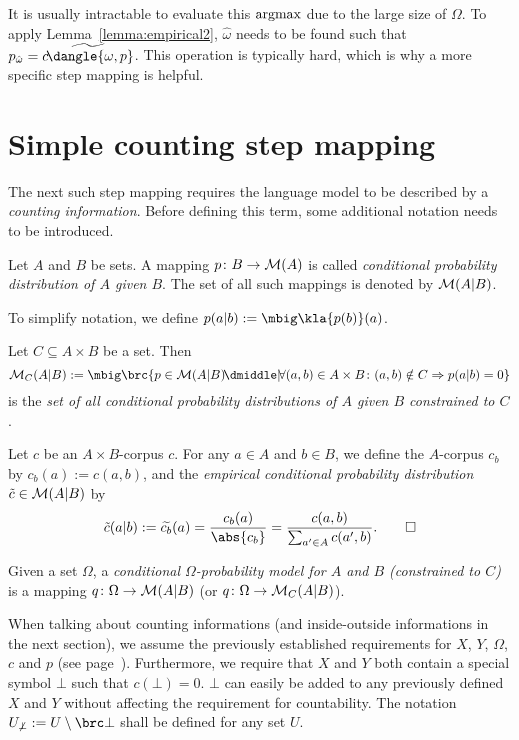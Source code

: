 It is usually intractable to evaluate this $\argmax$ due to the large size of
$\Omega$. To apply Lemma~\ref{lemma:empirical2}, $\hat\omega$ needs to be found
such that $p_{\hat\omega} = \widetilde{c\!\dangle{\omega,p}}$. This operation
is typically hard, which is why a more specific step mapping is helpful.

\section{Simple counting step mapping}

The next such step mapping requires the language model to be described by a
\emph{counting information}. Before defining this term, some additional
notation needs to be introduced.

\begin{definition}\label{def:02-cpd}
 Let $A$ and $B$ be sets. A mapping $p\colon B \to \mathcal M(A)$ is called
 \emph{conditional probability distribution of $A$ given $B$}. The set of all
 such mappings is denoted by $\mathcal M(A|B)$.
\end{definition}

To simplify notation, we define $p(a|b) := \mbig\kla{p(b)}(a)$.

\begin{definition}\label{def:02-cpd-restr}
 Let $C\subseteq A\times B$ be a set. Then
 \[
  \um_C(A|B) := \mbig\brc{p\in\um(A|B)\!\dmiddle|\! \forall (a,b)\in A\times B\colon (a,b)\notin C \Rightarrow p(a|b) = 0}
 \]
is the \emph{set of all conditional probability distributions of $A$ given $B$
 constrained to $C$}.
\end{definition}

\begin{definition}
 Let $c$ be an $A\times B$-corpus $c$. For any $a\in A$ and $b\in B$, we define
 the $A$-corpus $c_b$ by $c_b(a) := c(a,b)$, and the \emph{empirical
 conditional probability distribution} $\tilde c\in \mathcal M(A|B)$ by
 \[
  \tilde c(a|b) := \widetilde{c_b}(a) = \frac{c_b(a)}{\abs{c_b}} = \frac{c(a,b)}{\sum_{a'\in A} c(a',b)}. \qedhere
 \]
\end{definition}

\begin{definition}
 Given a set $\Omega$, a \emph{conditional $\Omega$-probability model for $A$
 and $B$ (constrained to $C$)} is a mapping $q\colon\Omega\to\mathcal M(A|B)$ (or
 $q\colon\Omega\to\mathcal M_C(A|B)$).
\end{definition}

When talking about counting informations (and inside-outside informations in
the next section), we assume the previously established requirements for $X$,
$Y$, $\Omega$, $c$ and $p$ (see page~\pageref{02-basic-requirements}).
Furthermore, we require that $X$ and $Y$ both contain a special symbol $\bot$
such that $c(\bot) = 0$. $\bot$ can easily be
added to any previously defined $X$ and $Y$ without affecting the requirement
for countability. The notation $U_{\not\bot} := U\setminus\brc\bot$ shall be
defined for any set $U$.

